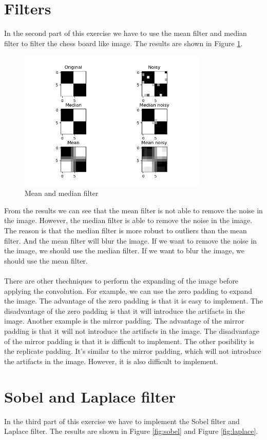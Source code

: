 \documentclass[12pt
,headinclude
,headsepline
,bibtotocnumbered
]{scrartcl}
\begin{document}
\section{Filters}
In the second part of this exercise we have to use the mean filter and median filter to filter the chess board like image. The results are shown in Figure \ref{fig:mean}. 
\begin{figure}[H]
    \centering
    \includegraphics[width=0.8\textwidth]{chessboard.png}
    \caption{Mean and median filter}
    \label{fig:mean}
\end{figure}
From the results we can see that the mean filter is not able to remove the noise in the image. However, the median filter is able to remove the noise in the image. The reason is that the median filter is more robust to outliers than the mean filter. And the mean filter will blur the image. If we want to remove the noise in the image, we should use the median filter. If we want to blur the image, we should use the mean filter.
\\\\
There are other thechniques to perform the expanding of the image before applying the convolution. For example, we can use the zero padding to expand the image. The advantage of the zero padding is that it is easy to implement. The disadvantage of the zero padding is that it will introduce the artifacts in the image. Another example is the mirror padding. The advantage of the mirror padding is that it will not introduce the artifacts in the image. The disadvantage of the mirror padding is that it is difficult to implement. The other posibility is the replicate padding. It's similar to the mirror padding, which will not introduce the artifacts in the image. However, it is also difficult to implement.
\section{Sobel and Laplace filter}
In the third part of this exercise we have to implement the Sobel filter and Laplace filter. The results are shown in Figure \ref{fig:sobel} and Figure \ref{fig:laplace}.
\end{document}
